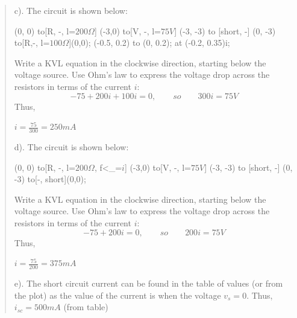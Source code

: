 \documentclass[12pt,a4paper]{article}
\begin{document}
\begin{enumerate}
\begin{quote}
\begin{center}
\begin{circuitikz}
                \end{circuitikz}
            \end{center}
        c). The circuit is shown below:
        \begin{center}
            \begin{circuitikz}
                \draw (0, 0) to[R, -, l=$200 \Omega$] (-3,0) to[V, -, l=$75V$] (-3, -3) to [short, -] (0, -3) to[R,-, l=$100\Omega$](0,0);
                \draw[->] (-0.5, 0.2)  to (0, 0.2);
                \node at (-0.2, 0.35){i};
            \end{circuitikz}
        \end{center}
        Write a KVL equation in the clockwise direction, starting below the voltage source. Use Ohm’s law to express the voltage drop across the resistors in terms of the current $i$:
        \[-75+200i+100i=0, \qquad so \qquad 300i =75 V\]
        Thus,\begin{center}
            $i=\frac{75}{300}=250 mA$ \\
        \end{center} 
        
        d). The circuit is shown below:
        \begin{center}
            \begin{circuitikz}
                \draw (0, 0) to[R, -, l=$200 \Omega$, f<_=$i$] (-3,0) to[V, -, l=$75V$] (-3, -3) to [short, -] (0, -3) to[-, short](0,0);
            \end{circuitikz}
        \end{center}
    Write a KVL equation in the clockwise direction, starting below the voltage source. Use Ohm’s law to express the voltage drop across the resistors in terms of the current $i$:
     \[-75+200i=0, \qquad so \qquad 200i =75 V\] %
    Thus,
    \begin{center}
        $i=\frac{75}{200}=375 mA$ \\
    \end{center}
    
     e). The short circuit current can be found in the table of values (or from the plot) as the value of the current is when the voltage $v_s = 0$. Thus, $i_{sc} = 500 mA$ (from table) \\
     

\end{quote}
\end{enumerate}
\end{document}

